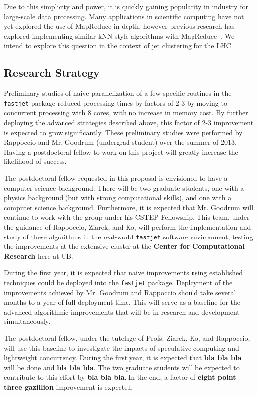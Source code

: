 \documentclass[times,11pt]{article}
\begin{document}
Due to this simplicity and power, it is quickly gaining popularity in industry
for large-scale data processing. Many applications in scientific computing have not
yet explored the use of MapReduce in depth, however
previous research has explored implementing similar kNN-style
algorithms with
MapReduce~\cite{knn-mapreduce-0, knn-mapreduce-1}. We intend to explore this
question in the context of jet clustering for the LHC.



\subsection{Research Strategy}

Preliminary studies of naive parallelization of a few specific
routines in the {\tt fastjet} package reduced processing times by
factors of 2-3 by moving to concurrent processing with 8 cores, with
no increase in memory cost. By further deploying the advanced
strategies described above, this factor of 2-3 improvement is expected
to grow significantly. 
These preliminary studies were performed by Rappoccio and Mr.
Goodrum (undergrad student) over the summer of 2013. Having a
postdoctoral fellow to work on this project will greatly increase the
likelihood of success. 

The postdoctoral fellow requested in this proposal is envisioned to
have a computer science background. There will be two graduate
students, one with a physics background (but with strong computational
skills), and one with a computer science background. Furthermore, it
is expected that Mr. Goodrum will continue to work with the group
under his CSTEP Fellowship. This team, under
the guidance of Rappoccio, Ziarek, and Ko, will perform the
implementation and study of these algorithms in the real-world 
{\tt fastjet} software environment, testing the improvements at the
extensive cluster at the {\bf Center for Computational Research} here
at UB. 

During the first year, it is expected that naive improvements using
established techniques could be deployed into the {\tt fastjet}
package. Deployment of the improvements achieved by Mr. Goodrum and
Rappoccio should take several months to a year of full deployment
time. This will serve as a baseline for the advanced algorithmic
improvements that will be in research and development simultaneously. 

The postdoctoral fellow, under the tutelage of Profs. Ziarek, Ko, and
Rappoccio, will use this baseline to investigate the
impacts of speculative computing and lightweight concurrency. 
During the first year, it is expected that {\bf bla bla bla} will be
done and {\bf bla bla bla}. The two graduate students will be expected
to contribute to this effort by {\bf bla bla bla}. In the end, a
factor of {\bf eight point three gazillion} improvement is expected. 
\end{document}
